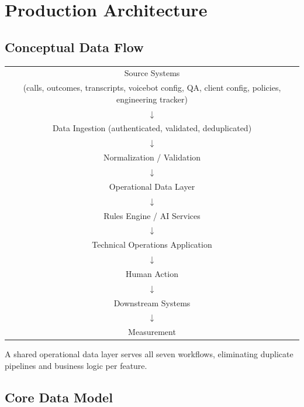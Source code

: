 \documentclass[11pt,a4paper]{article}
\begin{document}
\section{Production Architecture}

\subsection{Conceptual Data Flow}

\begin{center}
\small
\begin{tabular}{c}
Source Systems \\
(calls, outcomes, transcripts, voicebot config, QA, client config, policies, engineering tracker) \\
$\downarrow$ \\
Data Ingestion (authenticated, validated, deduplicated) \\
$\downarrow$ \\
Normalization / Validation \\
$\downarrow$ \\
Operational Data Layer \\
$\downarrow$ \\
Rules Engine / AI Services \\
$\downarrow$ \\
Technical Operations Application \\
$\downarrow$ \\
Human Action \\
$\downarrow$ \\
Downstream Systems \\
$\downarrow$ \\
Measurement
\end{tabular}
\end{center}

A shared operational data layer serves all seven workflows, eliminating duplicate pipelines and business logic per feature.

\subsection{Core Data Model}
\end{document}
